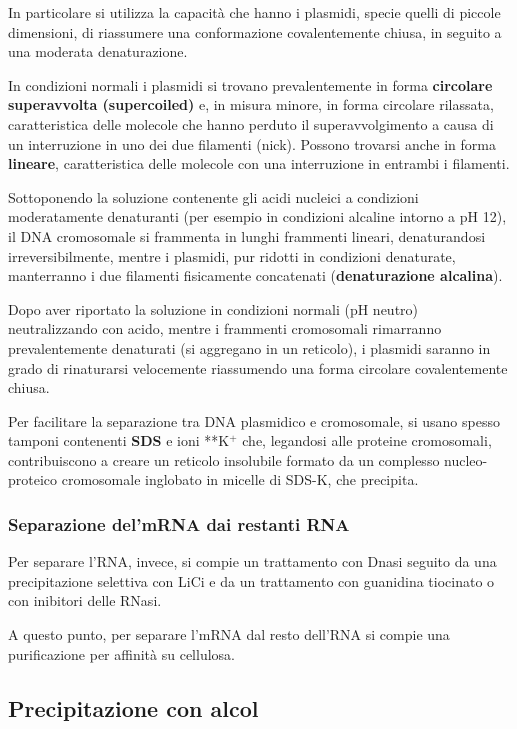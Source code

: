 \documentclass[11pt]{book}
\begin{document}
In particolare si utilizza la capacità che hanno i plasmidi, specie
quelli di piccole dimensioni, di riassumere una conformazione
covalentemente chiusa, in seguito a una moderata denaturazione.

In condizioni normali i plasmidi si trovano prevalentemente in forma
\textbf{circolare superavvolta (supercoiled)} e, in misura minore, in
forma circolare rilassata, caratteristica delle molecole che hanno
perduto il superavvolgimento a causa di un interruzione in uno dei due
filamenti (nick). Possono trovarsi anche in forma \textbf{lineare},
caratteristica delle molecole con una interruzione in entrambi i
filamenti.

Sottoponendo la soluzione contenente gli acidi nucleici a condizioni
moderatamente denaturanti (per esempio in condizioni alcaline intorno a
pH 12), il DNA cromosomale si frammenta in lunghi frammenti lineari,
denaturandosi irreversibilmente, mentre i plasmidi, pur ridotti in
condizioni denaturate, manterranno i due filamenti fisicamente
concatenati (\textbf{denaturazione alcalina}).

Dopo aver riportato la soluzione in condizioni normali (pH neutro)
neutralizzando con acido, mentre i frammenti cromosomali rimarranno
prevalentemente denaturati (si aggregano in un reticolo), i plasmidi
saranno in grado di rinaturarsi velocemente riassumendo una forma
circolare covalentemente chiusa.

Per facilitare la separazione tra DNA plasmidico e cromosomale, si usano
spesso tamponi contenenti \textbf{SDS} e ioni **K\(^+\) che, legandosi
alle proteine cromosomali, contribuiscono a creare un reticolo
insolubile formato da un complesso nucleo-proteico cromosomale inglobato
in micelle di SDS-K, che precipita.

\subsubsection{Separazione del'mRNA dai restanti
RNA}\label{separazione-delmrna-dai-restanti-rna}

Per separare l'RNA, invece, si compie un trattamento con Dnasi seguito
da una precipitazione selettiva con LiCi e da un trattamento con
guanidina tiocinato o con inibitori delle RNasi.

A questo punto, per separare l'mRNA dal resto dell'RNA si compie una
purificazione per affinità su cellulosa.

\subsection{Precipitazione con alcol}\label{precipitazione-con-alcol}
\end{document}
